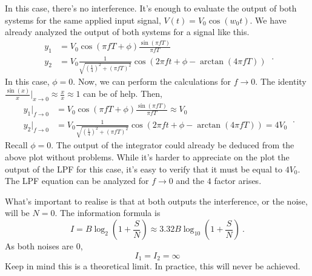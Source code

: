 \noindent In this case, there's no interference. It's enough to evaluate the output of both systems for the same applied input signal, $V(t) = V_0 \cos(w_0 t)$. We have already analyzed the output of both systems for a signal like this.
\begin{equation}
   \begin{split}
   y_1 &=  V_0 \cos(\pi f T + \phi) \frac{\sin(\pi f T)}{\pi f T} \\
   y_2 &= V_0 \frac{1}{\sqrt{ \left(\frac{1}{4} \right)^2 + (\pi f T)^2}} \cos \left(  2 \pi f t + \phi - \arctan \left( 4 \pi f T \right) \right) 
   \end{split} \ .
\end{equation}
\noindent In this case, $\phi = 0$. Now, we can perform the calculations for $f \rightarrow 0$. The identity $\frac{\sin(x)}{x}|_{x \rightarrow 0} \approx \frac{x}{x} \approx 1$ can be of help. Then,
\begin{equation}
   \begin{split}
   y_1|_{f\rightarrow 0} &=  V_0 \cos(\pi f T + \phi) \frac{\sin(\pi f T)}{\pi f T} \approx V_0 \\
   y_2|_{f\rightarrow 0} &=  V_0 \frac{1}{\sqrt{ \left(\frac{1}{4} \right)^2 + (\pi f T)^2}} \cos \left(  2 \pi f t + \phi - \arctan \left( 4 \pi f T \right) \right) = 4 V_0 %
   \end{split} \ .
\end{equation}
\noindent Recall $\phi = 0$. The output of the integrator could already be deduced from the above plot without problems. While it's harder to appreciate on the plot the output of the LPF for this case, it's easy to verify that it must be equal to $4 V_0$. The LPF equation can be analyzed for $f\rightarrow 0$ and the $4$ factor arises. %

\noindent What's important to realise is that at both outputs the interference, or the noise, will be $N=0$. The information formula is
\begin{equation}
   I = B \log_2 \left( 1 + \frac{S}{N} \right) \approx 3.32 B \log_{10} \left( 1 + \frac{S}{N}\right) \ .
\end{equation}
\noindent As both noises are $0$, %
\begin{equation}
   \boxed{
      I_1 = I_2 = \infty
   } 
\end{equation}
\noindent Keep in mind this is a theoretical limit. In practice, this will never be achieved.



